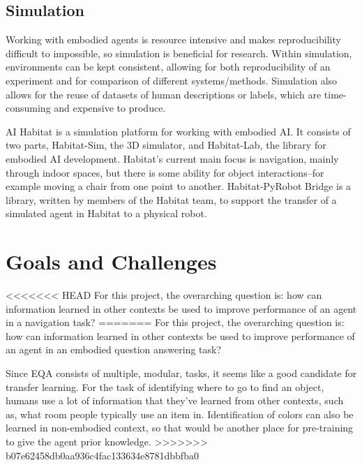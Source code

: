 \documentclass{article}
\begin{document}
\subsection{Simulation}
Working with embodied agents is resource intensive and makes reproducibility difficult to impossible, so simulation is beneficial for research. Within simulation, environments can be kept consistent, allowing for both reproducibility of an experiment and for comparison of different systems/methods. Simulation also allows for the reuse of datasets of human descriptions or labels, which are time-consuming and expensive to produce.  

AI Habitat is a simulation platform for working with embodied AI\cite{habitat19iccv}. It consists of two parts, Habitat-Sim, the 3D simulator, and Habitat-Lab, the library for embodied AI development. Habitat's current main focus is navigation, mainly through indoor spaces, but there is some ability for object interactions--for example moving a chair from one point to another. Habitat-PyRobot Bridge is a library, written by members of the Habitat team, to support the transfer of a simulated agent in Habitat to a physical robot\cite{Kadian_2020}. 


\section{Goals and Challenges}
<<<<<<< HEAD
For this project, the overarching question is: how can information learned in other contexts be used to improve performance of an agent in a navigation task? %
=======
For this project, the overarching question is: how can information learned in other contexts be used to improve performance of an agent in an embodied question answering task? %

Since EQA consists of multiple, modular, tasks, it seems like a good candidate for transfer learning. For the task of identifying where to go to find an object, humans use a lot of information that they've learned from other contexts, such as, what room people typically use an item in. Identification of colors can also be learned in non-embodied context, so that would be another place for pre-training to give the agent prior knowledge. 
>>>>>>> b07e62458db0aa936c4fac133634e8781dbbfba0
\end{document}
